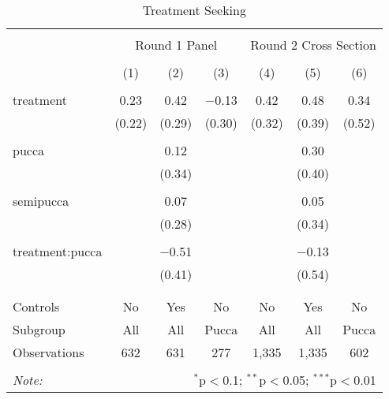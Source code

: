 
\begin{table}[!htbp] \centering 
  \caption{Treatment Seeking} 
  \label{tbl:Treatment Seeking} 
\begin{tabular}{@{\extracolsep{5pt}}lcccccc} 
\\[-1.8ex]\hline 
\hline \\[-1.8ex] 
 & \multicolumn{3}{c}{Round 1 Panel} & \multicolumn{3}{c}{Round 2 Cross Section} \\ 
\\[-1.8ex] & (1) & (2) & (3) & (4) & (5) & (6)\\ 
\hline \\[-1.8ex] 
 treatment & 0.23 & 0.42 & $-$0.13 & 0.42 & 0.48 & 0.34 \\ 
  & (0.22) & (0.29) & (0.30) & (0.32) & (0.39) & (0.52) \\ 
  & & & & & & \\ 
 pucca &  & 0.12 &  &  & 0.30 &  \\ 
  &  & (0.34) &  &  & (0.40) &  \\ 
  & & & & & & \\ 
 semipucca &  & 0.07 &  &  & 0.05 &  \\ 
  &  & (0.28) &  &  & (0.34) &  \\ 
  & & & & & & \\ 
 treatment:pucca &  & $-$0.51 &  &  & $-$0.13 &  \\ 
  &  & (0.41) &  &  & (0.54) &  \\ 
  & & & & & & \\ 
\hline \\[-1.8ex] 
Controls & No & Yes & No & No & Yes & No \\ 
Subgroup & All & All & Pucca & All & All & Pucca \\ 
Observations & 632 & 631 & 277 & 1,335 & 1,335 & 602 \\ 
\hline 
\hline \\[-1.8ex] 
\textit{Note:}  & \multicolumn{6}{r}{$^{*}$p$<$0.1; $^{**}$p$<$0.05; $^{***}$p$<$0.01} \\ 
\end{tabular} 
\end{table} 

